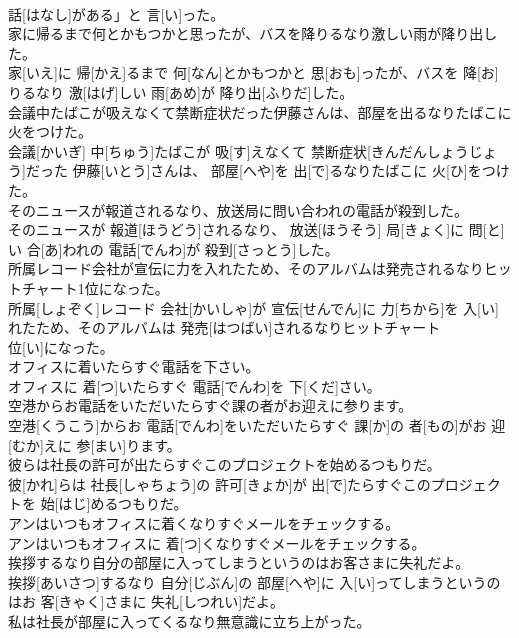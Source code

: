 \documentclass[8pt]{extreport}
\begin{document}
\begin{CJK}{UTF8}{min}
\\	話[はなし]がある」と 言[い]った。
\\	家に帰るまで何とかもつかと思ったが、バスを降りるなり激しい雨が降り出した。	
\\	家[いえ]に 帰[かえ]るまで 何[なん]とかもつかと 思[おも]ったが、バスを 降[お]りるなり 激[はげ]しい 雨[あめ]が 降り出[ふりだ]した。
\\	会議中たばこが吸えなくて禁断症状だった伊藤さんは、部屋を出るなりたばこに火をつけた。	
\\	会議[かいぎ] 中[ちゅう]たばこが 吸[す]えなくて 禁断症状[きんだんしょうじょう]だった 伊藤[いとう]さんは、 部屋[へや]を 出[で]るなりたばこに 火[ひ]をつけた。
\\	そのニュースが報道されるなり、放送局に問い合われの電話が殺到した。	
\\	そのニュースが 報道[ほうどう]されるなり、 放送[ほうそう] 局[きょく]に 問[と]い 合[あ]われの 電話[でんわ]が 殺到[さっとう]した。
\\	所属レコード会社が宣伝に力を入れたため、そのアルバムは発売されるなりヒットチャート1位になった。	
\\	所属[しょぞく]レコード 会社[かいしゃ]が 宣伝[せんでん]に 力[ちから]を 入[い]れたため、そのアルバムは 発売[はつばい]されるなりヒットチャート 
\\	位[い]になった。
\\	オフィスに着いたらすぐ電話を下さい。	
\\	オフィスに 着[つ]いたらすぐ 電話[でんわ]を 下[くだ]さい。
\\	空港からお電話をいただいたらすぐ課の者がお迎えに参ります。	
\\	空港[くうこう]からお 電話[でんわ]をいただいたらすぐ 課[か]の 者[もの]がお 迎[むか]えに 参[まい]ります。
\\	彼らは社長の許可が出たらすぐこのプロジェクトを始めるつもりだ。	
\\	彼[かれ]らは 社長[しゃちょう]の 許可[きょか]が 出[で]たらすぐこのプロジェクトを 始[はじ]めるつもりだ。
\\	アンはいつもオフィスに着くなりすぐメールをチェックする。	
\\	アンはいつもオフィスに 着[つ]くなりすぐメールをチェックする。
\\	挨拶するなり自分の部屋に入ってしまうというのはお客さまに失礼だよ。	
\\	挨拶[あいさつ]するなり 自分[じぶん]の 部屋[へや]に 入[い]ってしまうというのはお 客[きゃく]さまに 失礼[しつれい]だよ。
\\	私は社長が部屋に入ってくるなり無意識に立ち上がった。	

\end{CJK}
\end{document}
